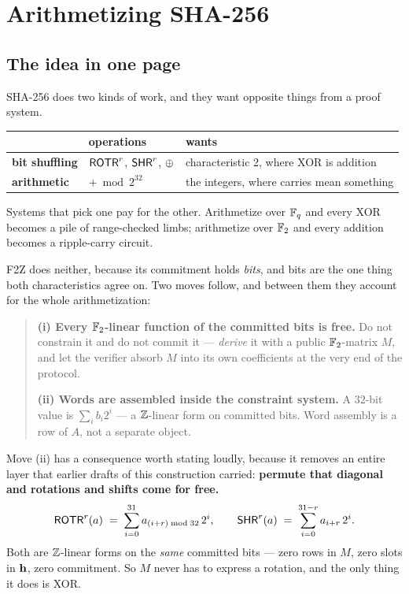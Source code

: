 \section{Arithmetizing SHA-256}\label{sec:arith}

\subsection{The idea in one page}

SHA-256 does two kinds of work, and they want opposite things from a proof
system.

\begin{center}\small
\begin{tabular}{@{}lll@{}}
\toprule
& operations & wants \\
\midrule
\textbf{bit shuffling} & $\mathsf{ROTR}^r$, $\mathsf{SHR}^r$, $\oplus$ & characteristic 2, where
  XOR is addition\\
\textbf{arithmetic} & $+ \bmod 2^{32}$ & the integers, where carries mean
  something\\
\bottomrule
\end{tabular}
\end{center}

Systems that pick one pay for the other. Arithmetize over $\mathbb{F}_q$ and every XOR
becomes a pile of range-checked limbs; arithmetize over $\mathbb{F}_2$ and every
addition becomes a ripple-carry circuit.

F2Z does neither, because its commitment holds \emph{bits}, and bits are the one
thing both characteristics agree on. Two moves follow, and between them they
account for the whole arithmetization:

\begin{quote}
\textbf{(i) Every $\mathbb{F}_2$-linear function of the committed bits is free.} Do not
constrain it and do not commit it --- \emph{derive} it with a public
$\mathbb{F}_2$-matrix $M$, and let the verifier absorb $M$ into its own coefficients at
the very end of the protocol.

\textbf{(ii) Words are assembled inside the constraint system.} A $32$-bit value
is $\sum_i b_i 2^i$ --- a $\mathbb{Z}$-linear form on committed bits. Word assembly is a
row of $A$, not a separate object.
\end{quote}

Move (ii) has a consequence worth stating loudly, because it removes an entire
layer that earlier drafts of this construction carried: \textbf{permute that
diagonal and rotations and shifts come for free.}
\[
  \mathsf{ROTR}^r(a) \;=\; \sum_{i=0}^{31} a_{(i+r)\bmod 32}\,2^i ,
  \qquad
  \mathsf{SHR}^r(a) \;=\; \sum_{i=0}^{31-r} a_{i+r}\,2^i .
\]
Both are $\mathbb{Z}$-linear forms on the \emph{same} committed bits --- zero rows in
$M$, zero slots in $\mathbf{h}$, zero commitment. So $M$ never has to express a
rotation, and the only thing it does is XOR.


